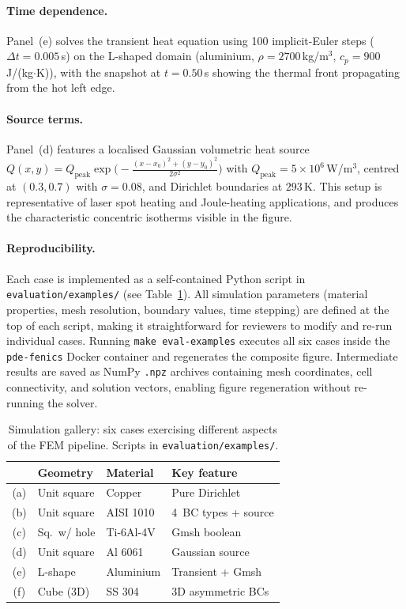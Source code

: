 \documentclass[twocolumn]{article}
\begin{document}
\paragraph{Time dependence.}
Panel~(e) solves the transient heat equation using 100 implicit-Euler
steps ($\Delta t = 0.005$\,s) on the L-shaped domain (aluminium,
$\rho=2700$\,kg/m$^3$, $c_p=900$\,J/(kg$\cdot$K)), with the
snapshot at $t=0.50$\,s showing the thermal front propagating from
the hot left edge.

\paragraph{Source terms.}
Panel~(d) features a localised Gaussian volumetric heat source
$Q(x,y) = Q_\mathrm{peak} \exp\!\bigl(-\frac{(x-x_0)^2 +
(y-y_0)^2}{2\sigma^2}\bigr)$ with $Q_\mathrm{peak} = 5 \times 10^6$\,W/m$^3$,
centred at $(0.3, 0.7)$ with $\sigma=0.08$, and Dirichlet boundaries
at $293$\,K.  This setup is representative of laser spot heating and
Joule-heating applications, and produces the characteristic concentric
isotherms visible in the figure.

\paragraph{Reproducibility.}
Each case is implemented as a self-contained Python script in
\texttt{evaluation/examples/} (see Table~\ref{tab:gallery}).
All simulation parameters (material properties, mesh resolution,
boundary values, time stepping) are defined at the top of each script,
making it straightforward for reviewers to modify and re-run individual
cases.  Running \texttt{make eval-examples} executes all six cases
inside the \texttt{pde-fenics} Docker container and regenerates the
composite figure.  Intermediate results are saved as NumPy
\texttt{.npz} archives containing mesh coordinates, cell connectivity,
and solution vectors, enabling figure regeneration without re-running
the solver.

\begin{table}[htbp]
  \centering\footnotesize
  \caption{Simulation gallery: six cases exercising different aspects
    of the FEM pipeline.  Scripts in \texttt{evaluation/examples/}.}
  \label{tab:gallery}
  \setlength{\tabcolsep}{4pt}
  \begin{tabular}{cllp{2.5cm}}
    \toprule
    & \textbf{Geometry}  & \textbf{Material}  & \textbf{Key feature} \\
    \midrule
    (a) & Unit square     & Copper        & Pure Dirichlet \\
    (b) & Unit square     & AISI 1010     & 4~BC types + source \\
    (c) & Sq.\ w/ hole   & Ti-6Al-4V     & Gmsh boolean \\
    (d) & Unit square     & Al 6061       & Gaussian source \\
    (e) & L-shape         & Aluminium     & Transient + Gmsh \\
    (f) & Cube (3D)       & SS 304        & 3D asymmetric BCs \\
    \bottomrule
  \end{tabular}
\end{table}
\end{document}

